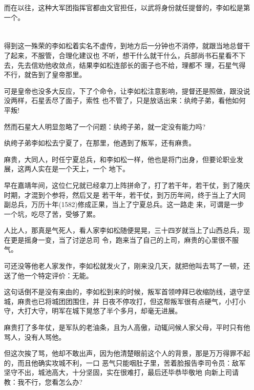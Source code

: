 \documentclass[11pt,a4paper,onecolumn]{article}
\begin{document}
而在以往，这种大军团指挥官都由文官担任，以武将身份就任提督的，李如松是第一个。

\section[\thesection]{}

得到这一殊荣的李如松着实名不虚传，到地方后一分钟也不消停，就跟当地总督干了起来，不服管，合理化建议也
不听，想干什么就干什么，兵部尚书石星看不下去，先去信劝他收敛点，结果李如松连部长的面子也不给，理都不
理，石星气得不行，就告到了皇帝那里。

可是皇帝也没多大反应，下了个命令，让李如松注意影响，提督还是照做，跟没说没两样，石星丢尽了面子，索性
也不管了，只是放话出来：纨绔子弟，看他如何平叛!

然而石星大人明显忽略了一个问题：纨绔子弟，就一定没有能力吗?

纨绔子弟李如松去宁夏了，在那里，他遇到了叛军，还有麻贵。

麻贵，大同人，时任宁夏总兵，和李如松一样，他也是将门出身，但要论职业发展，这两人实在是一个天上，一个
地下。

早在嘉靖年间，这位仁兄就已经拿刀上阵拼命了，打了若干年，若干仗，到了隆庆时期，才混到个参将，然后又是
若干年，若干仗，到万历年间，终于当上了大同副总兵，万历十年(1582)修成正果，当上了宁夏总兵。这一路走
来，可谓是一步一个坑，吃尽了苦，受够了累。

人比人，那真是气死人，看人家李如松随便晃晃，三十四岁就当上了山西总兵，现在更是摇身一变，当了讨逆总司
令，跑来当了自己的上司，麻贵的心里很不服气。

可还没等他老人家发作，李如松就发火了，刚来没几天，就把他叫去骂了一顿，还送了他一个特定评价：无能。

这句话倒不是没有来由的，李如松到来的时候，叛军首领哱拜已收缩防线，退守坚城，麻贵也已将城团团围住，并
日夜不停攻打，但这帮叛军很有点硬气，小打小守，大打大守，明军在城下晃悠了半个多月，却毫无进展。

麻贵打了多年仗，是军队的老油条，且为人高傲，动辄问候人家父母，平时只有他骂人，没有人骂他。

但这次挨了骂，他却不敢出声，因为他清楚眼前这个人的背景，那是万万得罪不起的，而且他确实攻城不利，一口
恶气只能咽肚子里，苦着脸报告李司令员：敌军坚守不出，城池高大，十分坚固，实在很难打，最后还毕恭毕敬地
向新上司请教：我不行，您看怎么办?

\section[\thesection]{}
\end{document}
